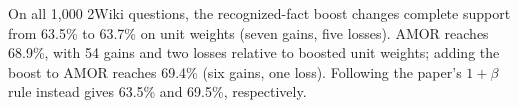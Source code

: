 On all 1,000 2Wiki questions, the recognized-fact boost changes complete support from 63.5\% to 63.7\% on unit weights (seven gains, five losses).
AMOR reaches 68.9\%, with 54 gains and two losses relative to boosted unit weights; adding the boost to AMOR reaches 69.4\% (six gains, one loss).
Following the paper's $1+\beta$ rule instead gives 63.5\% and 69.5\%, respectively.
